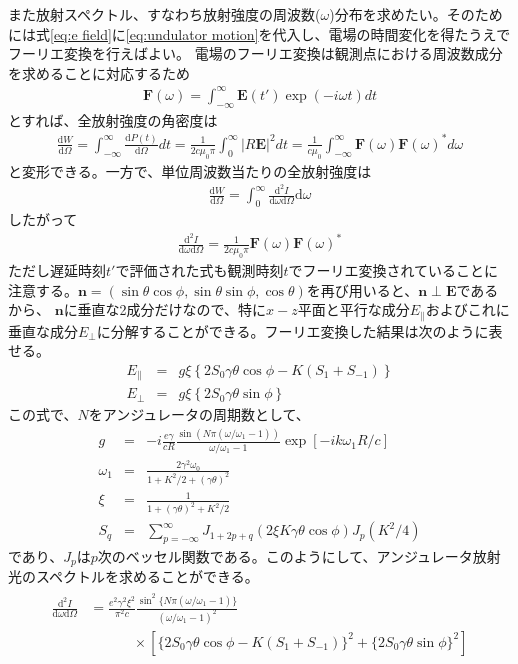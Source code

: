\documentclass[a4paper,11pt,uplatex]{jsbook}
\begin{document}
また放射スペクトル、すなわち放射強度の周波数($\omega$)分布を求めたい。そのためには式\ref{eq:e field}に\ref{eq:undulator motion}を代入し、電場の時間変化を得たうえでフーリエ変換を行えばよい。
電場のフーリエ変換は観測点における周波数成分を求めることに対応するため
\begin{eqnarray}
  \bm{F}(\omega) = \int_{-\infty}^{\infty} \bm{E}(t')\exp(-i\omega t)dt
\end{eqnarray}
とすれば、全放射強度の角密度は
\begin{eqnarray}
  \frac{\text{d}W}{\text{d}\Omega} = \int_{-\infty}^{\infty} \frac{\text{d}P(t)}{\text{d}\Omega}dt = \frac{1}{2c\mu_0\pi}\int_{0}^{\infty} \left|R\bm{E}\right|^2 dt 
  = \frac{1}{c\mu_0}\int_{-\infty}^{\infty} \bm{F}(\omega)\bm{F}(\omega)^*d\omega
\end{eqnarray}
と変形できる。一方で、単位周波数当たりの全放射強度は
\begin{eqnarray}
  \frac{\text{d}W}{\text{d}\Omega} = \int_{0}^{\infty}\frac{\text{d}^2I}{\text{d}\omega \text{d}\Omega}\text{d}\omega
\end{eqnarray}
したがって
\begin{eqnarray}
  \frac{\text{d}^2I}{\text{d}\omega \text{d}\Omega} = \frac{1}{2c\mu_0\pi}\bm{F}(\omega)\bm{F}(\omega)^*
\end{eqnarray}
ただし遅延時刻$t'$で評価された式も観測時刻$t$でフーリエ変換されていることに注意する。$\bm{n} =(\sin\theta\cos\phi,\sin\theta\sin\phi,\cos\theta)$を再び用いると、$\bm{n}\perp\bm{E}$であるから、
$\bm{n}$に垂直な2成分だけなので、特に$x-z$平面と平行な成分$E_{\parallel}$およびこれに垂直な成分$E_{\perp}$に分解することができる。フーリエ変換した結果は次のように表せる。
\begin{eqnarray}
  E_\parallel &=& g\xi\left\{2S_0\gamma \theta \cos\phi - K (S_1 + S_{-1})\right\}\\
  E_\perp &=& g\xi\left\{2S_0\gamma \theta \sin \phi\right\}
\end{eqnarray}
この式で、$N$をアンジュレータの周期数として、
\begin{eqnarray}
  g &=& -i \frac{e\gamma}{cR} \frac{\sin \left( N\pi (\omega/\omega_1 -1) \right)}{\omega/\omega_1 -1}\exp\left[-ik\omega_1 R/c \right]\\
  \omega_1 &=& \frac{2\gamma^2\omega_0}{1+K^2/2 + (\gamma\theta)^2}\\
  \xi &=& \frac{1}{1 + (\gamma\theta)^2 + K^2/2} \\
  S_q &=& \sum_{p = -\infty}^{\infty} J_{1+2p+q}(2\xi K\gamma\theta\cos\phi)J_p(K^2/4)
\end{eqnarray}
であり、$J_p$は$p$次のベッセル関数である。このようにして、アンジュレータ放射光のスペクトルを求めることができる。
\begin{eqnarray}\label{eq:spectrum}
  \begin{split}
   \frac{\text{d}^2I}{\text{d}\omega \text{d}\Omega} &= \frac{e^2\gamma^2\xi^2}{\pi^2 c}\frac{\sin^2 \{N\pi(\omega/\omega_1 -1)\}}{(\omega/\omega_1 -1)^2}\\
   &~~~~~~~~~~~~~~\times\left[ \{2S_0\gamma\theta\cos\phi - K(S_1 + S_{-1})\}^2 + \{2S_0\gamma \theta \sin \phi\}^2 \right]
  \end{split}
\end{eqnarray}
\end{document}
